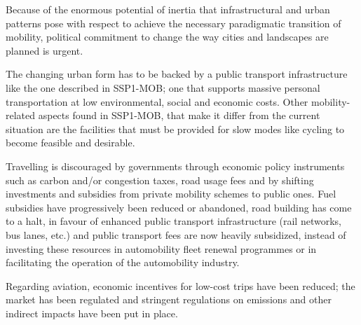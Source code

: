 Because of the enormous potential of inertia that infrastructural and urban patterns pose with respect to achieve the necessary paradigmatic transition of mobility, political commitment to change the way cities and landscapes are planned is urgent.

The changing urban form has to be backed by a public transport infrastructure like the one described in SSP1-MOB; one that supports massive personal transportation at low environmental, social and economic costs. Other mobility-related aspects found in SSP1-MOB, that make it differ from the current situation are the facilities that must be provided for slow modes like cycling to become feasible and desirable.

Travelling is discouraged by governments through economic policy instruments such as carbon and/or congestion taxes, road usage fees and by shifting investments and subsidies from private mobility schemes to public ones. Fuel subsidies have progressively been reduced or abandoned, road building has come to a halt, in favour of enhanced public transport infrastructure (rail networks, bus lanes, etc.) and public transport fees are now heavily subsidized, instead of investing these resources in automobility fleet renewal programmes or in facilitating the operation of the automobility industry.

Regarding aviation, economic incentives for low-cost trips have been reduced; the market has been regulated and stringent regulations on emissions and other indirect impacts have been put in place.